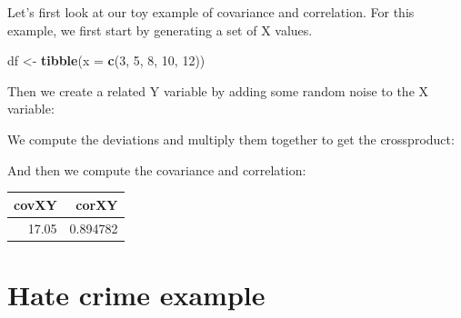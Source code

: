 \documentclass[
  12pt,
]{book}
\newenvironment{Shaded}{\begin{snugshade}}{\end{snugshade}}
\newcommand{\AttributeTok}[1]{\textcolor[rgb]{0.13,0.29,0.53}{#1}}
\newcommand{\DecValTok}[1]{\textcolor[rgb]{0.00,0.00,0.81}{#1}}
\newcommand{\FunctionTok}[1]{\textcolor[rgb]{0.13,0.29,0.53}{\textbf{#1}}}
\newcommand{\NormalTok}[1]{#1}
\newcommand{\OtherTok}[1]{\textcolor[rgb]{0.56,0.35,0.01}{#1}}
\newcommand{\SpecialCharTok}[1]{\textcolor[rgb]{0.81,0.36,0.00}{\textbf{#1}}}
\begin{document}
Let's first look at our toy example of covariance and correlation. For this example, we first start by generating a set of X values.

\begin{Shaded}
\begin{Highlighting}[]
\NormalTok{df }\OtherTok{\textless{}{-}}
  \FunctionTok{tibble}\NormalTok{(}\AttributeTok{x =} \FunctionTok{c}\NormalTok{(}\DecValTok{3}\NormalTok{, }\DecValTok{5}\NormalTok{, }\DecValTok{8}\NormalTok{, }\DecValTok{10}\NormalTok{, }\DecValTok{12}\NormalTok{))}
\end{Highlighting}
\end{Shaded}

Then we create a related Y variable by adding some random noise to the X variable:

We compute the deviations and multiply them together to get the crossproduct:

And then we compute the covariance and correlation:

\begin{Shaded}
\end{Shaded}

\begin{tabular}{r|r}
\hline
covXY & corXY\\
\hline
17.05 & 0.894782\\
\hline
\end{tabular}

\hypertarget{hate-crime-example}{%
\section{Hate crime example}\label{hate-crime-example}}
\end{document}

